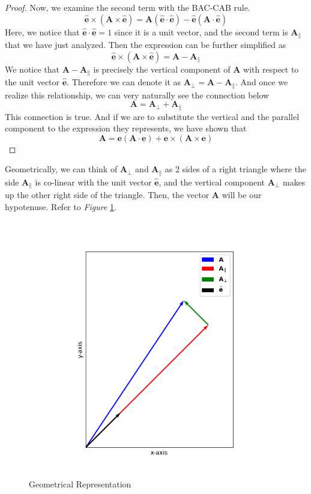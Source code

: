 \documentclass[12pt]{article}
\newcommand{\paren}[1]{\left( #1 \right)}
\begin{document}
\begin{enumerate}
\begin{proof}
        Now, we examine the second term with the BAC-CAB rule.
        \[
        \hat{\mathbf{e}}\times \paren{\mathbf{A}\times\hat{\mathbf{e}}} = \mathbf{A}\paren{\hat{\mathbf{e}}\cdot\hat{\mathbf{e}}} - \hat{\mathbf{e}}\paren{\mathbf{A}\cdot\hat{\mathbf{e}}}
        \]
        Here, we notice that $\hat{\mathbf{e}}\cdot \hat{\mathbf{e}} = 1$ since it is a unit vector, and the second term is $\mathbf{A}_\parallel$ that we have just analyzed. Then the expression can be further simplified as
        \[
         \hat{\mathbf{e}}\times \paren{\mathbf{A}\times\hat{\mathbf{e}}} = \mathbf{A} - \mathbf{A}_\parallel
        \]
        We notice that $\mathbf{A} - \mathbf{A}_\parallel$ is precisely the vertical component of $\mathbf{A}$ with respect to the unit vector $\hat{\mathbf{e}}$. Therefore we can denote it as $\mathbf{A}_\perp = \mathbf{A} - \mathbf{A}_\parallel$. And once we realize this relationship, we can very naturally see the connection below
        \[
        \mathbf{A} = \mathbf{A}_\perp + \mathbf{A}_\parallel
        \]
        This connection is true. And if we are to substitute the vertical and the parallel component to the expression they represents, we have shown that
        \[
        \mathbf{A} = \mathbf{e} (\mathbf{A} \cdot \mathbf{e}) + \mathbf{e} \times (\mathbf{A} \times \mathbf{e})
        \]
        \end{proof}
        \newpage
        Geometrically, we can think of $\mathbf{A}_\perp$ and $\mathbf{A}_\parallel$ as 2 sides of a right triangle where the side $\mathbf{A}_\parallel$ is co-linear with the unit vector $\hat{\mathbf{e}}$, and the vertical component $\mathbf{A}_\perp$ makes up the other right side of the triangle. Then, the vector $\mathbf{A}$ will be our hypotenuse. Refer to \textit{Figure} \ref{fig:1.24}.
            \begin{figure}[!h]
                \centering
                \includegraphics[width=0.5\linewidth]{Pictures/PS00/Figure_4.png}
                \caption{Geometrical Representation}
                \label{fig:1.24}
            \end{figure}


\end{enumerate}
\end{document}
